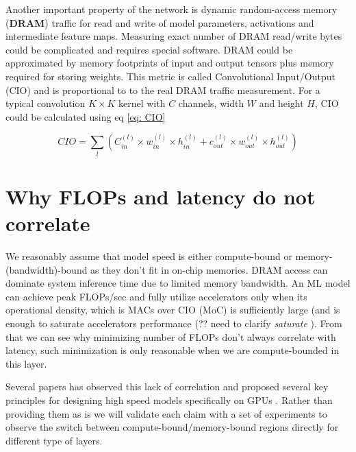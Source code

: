 Another important property of the network is dynamic random-access memory (\textbf{DRAM}) traffic for read and write of model parameters, activations and intermediate feature maps. Measuring exact number of DRAM read/write bytes could be complicated and requires special software. DRAM could be approximated by memory footprints of input and output tensors plus memory required for storing weights. This metric is called Convolutional Input/Output (CIO) \cite{chao2019_hardnet} and is proportional to to the real DRAM traffic measurement. For a typical convolution $K \times K$ kernel with $C$ channels, width $W$ and height $H$, CIO could be calculated using eq \ref{eq: CIO}

\begin{equation}
    C I O=\sum_{l}\left(C_{in}^{(l)} \times w_{in}^{(l)} \times h_{in}^{(l)}+c_{o u t}^{(l)} \times w_{o u t}^{(l)} \times h_{o u t}^{(l)}\right)
    \label{eq: CIO}
\end{equation}

\section{Why FLOPs and latency do not correlate}




We reasonably assume that model speed is either compute-bound or memory-(bandwidth)-bound as they don't fit in on-chip memories. DRAM access can dominate system inference time due to limited memory bandwidth. An ML model can achieve peak FLOPs/sec and fully utilize accelerators only when its operational density, which is MACs over CIO (MoC) is sufficiently large (and is enough to saturate accelerators performance (?? need to clarify \textit{saturate} ). 
From that we can see why minimizing number of FLOPs don't always correlate with latency, such minimization is only reasonable when we are compute-bounded in this layer. 

Several papers has observed this lack of correlation and proposed several key principles for designing high speed models specifically on GPUs \cite{radosavovic2020_designing} \cite{lee2020_compounding_improvements}. Rather than providing them as is we will validate each claim with a set of experiments to observe the switch between compute-bound/memory-bound regions directly for different type of layers.

